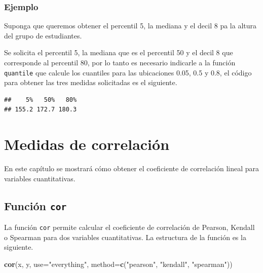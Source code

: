 \documentclass[10pt,]{krantz}
\makeatletter
\newenvironment{Shaded}{\begin{snugshade}}{\end{snugshade}}
\newcommand{\KeywordTok}[1]{\textcolor[rgb]{0.13,0.29,0.53}{\textbf{{#1}}}}
\newcommand{\DataTypeTok}[1]{\textcolor[rgb]{0.13,0.29,0.53}{{#1}}}
\newcommand{\FloatTok}[1]{\textcolor[rgb]{0.00,0.00,0.81}{{#1}}}
\newcommand{\StringTok}[1]{\textcolor[rgb]{0.31,0.60,0.02}{{#1}}}
\newcommand{\NormalTok}[1]{{#1}}
\newenvironment{kframe}{%
\medskip{}
\setlength{\fboxsep}{.8em}
 \def\at@end@of@kframe{}%
 \ifinner\ifhmode%
  \def\at@end@of@kframe{\end{minipage}}%
  \begin{minipage}{\columnwidth}%
 \fi\fi%
 \def\FrameCommand##1{\hskip\@totalleftmargin \hskip-\fboxsep
 \colorbox{shadecolor}{##1}\hskip-\fboxsep
     \hskip-\linewidth \hskip-\@totalleftmargin \hskip\columnwidth}%
 \MakeFramed {\advance\hsize-\width
   \@totalleftmargin\z@ \linewidth\hsize
   \@setminipage}}%
 {\par\unskip\endMakeFramed%
 \at@end@of@kframe}
\renewenvironment{Shaded}{\begin{kframe}}{\end{kframe}}
\makeatother
\begin{document}
\subsection*{Ejemplo}\label{ejemplo-37}


Suponga que queremos obtener el percentil 5, la mediana y el decil 8 pa
la altura del grupo de estudiantes.

Se solicita el percentil 5, la mediana que es el percentil 50 y el decil
8 que corresponde al percentil 80, por lo tanto es necesario indicarle a
la función \texttt{quantile} que calcule los cuantiles para las
ubicaciones 0.05, 0.5 y 0.8, el código para obtener las tres medidas
solicitadas es el siguiente.

\begin{Shaded}
\end{Shaded}

\begin{verbatim}
##    5%   50%   80% 
## 155.2 172.7 180.3
\end{verbatim}

\chapter{\texorpdfstring{Medidas de correlación
\label{correl}}{Medidas de correlación }}\label{medidas-de-correlacion}

En este capítulo se mostrará cómo obtener el coeficiente de correlación
lineal para variables cuantitativas.

\section{\texorpdfstring{Función \texttt{cor} 
}{Función cor  }}\label{funcion-cor}

La función \texttt{cor} permite calcular el coeficiente de correlación
de Pearson, Kendall o Spearman para dos variables cuantitativas. La
estructura de la función es la siguiente.

\begin{Shaded}
\begin{Highlighting}[]
\KeywordTok{cor}\NormalTok{(x, y, }\DataTypeTok{use=}\StringTok{"everything"}\NormalTok{,}
    \DataTypeTok{method=}\KeywordTok{c}\NormalTok{(}\StringTok{"pearson"}\NormalTok{, }\StringTok{"kendall"}\NormalTok{, }\StringTok{"spearman"}\NormalTok{))}
\end{Highlighting}
\end{Shaded}
\end{document}
